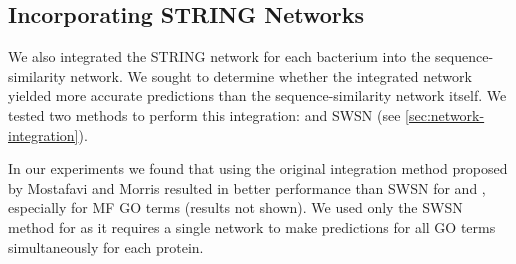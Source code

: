 \subsection{Incorporating STRING Networks}
\label{sec:loso-incorporate-string}
We also integrated the STRING network for each bacterium into the sequence-similarity network. We sought to determine whether the integrated network yielded more accurate predictions than the sequence-similarity network itself.  We tested two methods to perform this integration:  and SWSN (see \cref{sec:network-integration}). 

In our experiments we found that using the original integration method proposed by Mostafavi and Morris resulted in better performance than SWSN for \sinksource and \genemania, especially for MF GO terms (results not shown). 
We used only the SWSN method for \birgrank as it requires a single network to make predictions for all GO terms simultaneously for each protein.


